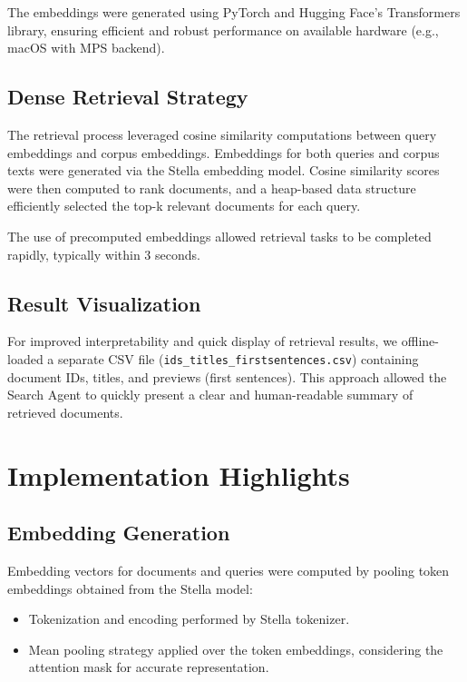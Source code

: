 \documentclass{article}
\begin{document}
The embeddings were generated using PyTorch and Hugging Face's Transformers library, ensuring efficient and robust performance on available hardware (e.g., macOS with MPS backend).

\subsection{Dense Retrieval Strategy}

The retrieval process leveraged cosine similarity computations between query embeddings and corpus embeddings. Embeddings for both queries and corpus texts were generated via the Stella embedding model. Cosine similarity scores were then computed to rank documents, and a heap-based data structure efficiently selected the top-k relevant documents for each query.

The use of precomputed embeddings allowed retrieval tasks to be completed rapidly, typically within 3 seconds.

\subsection{Result Visualization}

For improved interpretability and quick display of retrieval results, we offline-loaded a separate CSV file (\texttt{ids\_titles\_firstsentences.csv}) containing document IDs, titles, and previews (first sentences). This approach allowed the Search Agent to quickly present a clear and human-readable summary of retrieved documents.

\section{Implementation Highlights}

\subsection{Embedding Generation}

Embedding vectors for documents and queries were computed by pooling token embeddings obtained from the Stella model:
\begin{itemize}
    \item Tokenization and encoding performed by Stella tokenizer.
    \item Mean pooling strategy applied over the token embeddings, considering the attention mask for accurate representation.
\end{itemize}
\end{document}
